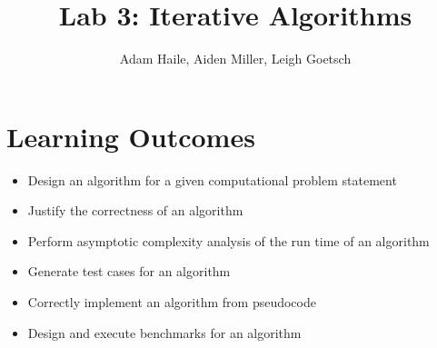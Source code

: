 \documentclass{labReport}
\title{Lab 3: Iterative Algorithms}
\author{Adam Haile, Aiden Miller, Leigh Goetsch}
\begin{document}
\maketitle

\section*{Learning Outcomes}
\begin{itemize}
    \item Design an algorithm for a given computational problem statement
    \item Justify the correctness of an algorithm
    \item Perform asymptotic complexity analysis of the run time of an algorithm
    \item Generate test cases for an algorithm
    \item Correctly implement an algorithm from pseudocode
    \item Design and execute benchmarks for an algorithm
\end{itemize}

\end{document}
